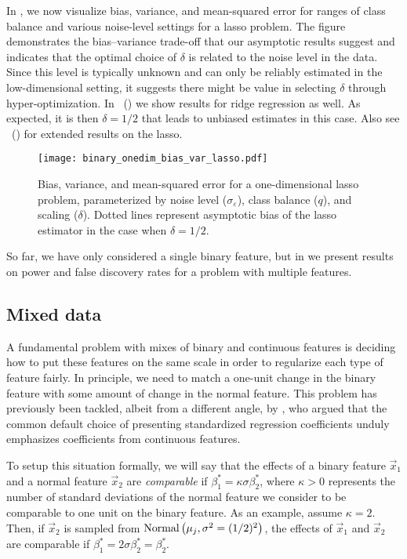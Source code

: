 In , we now visualize bias, variance, and mean-squared
error for ranges of class balance and various noise-level settings for a lasso problem. The
figure demonstrates the bias--variance trade-off that our asymptotic results suggest and
indicates that the optimal choice of \(\delta\) is related to the noise level in the data.
Since this level is typically unknown and can only be reliably estimated in the
low-dimensional setting, it suggests there might be value in selecting \(\delta\) through
hyper-optimization. In
~() we show
results for ridge regression as well. As expected, it is then \(\delta = 1/2\) that leads
to unbiased estimates in this case. Also see
~() for extended
results on the lasso.

\begin{figure}[htb]
  \centering
  \texttt{[image: binary\_onedim\_bias\_var\_lasso.pdf]}
  \caption{%
    Bias, variance, and mean-squared error for a one-dimensional lasso problem,
    parameterized by noise level (\(\sigma_\varepsilon\)), class balance (\(q\)), and
    scaling (\(\delta\)). Dotted lines represent asymptotic bias of the lasso
    estimator in the case when \(\delta = 1/2\).}
  \label{fig:bias-var-onedim-lasso}
\end{figure}

So far, we have only considered a single binary feature, but in
 we present results on power and false discovery rates for a
problem with multiple features.

\subsection{Mixed data}%
\label{sec:mixed-data}

A fundamental problem with mixes of binary and continuous features is deciding how to put
these features on the same scale in order to regularize each type of feature fairly. In
principle, we need to match a one-unit change in the binary feature with some amount of
change in the normal feature. This problem has previously been tackled, albeit from a
different angle, by \citet{gelman2008}, who argued that the common default choice of
presenting standardized regression coefficients unduly emphasizes coefficients from
continuous features.

To setup this situation formally, we will say that the effects of a binary feature
\(\vec{x}_1\) and a normal feature \(\vec{x}_2\) are \emph{comparable} if \(\beta^*_1 =
\kappa \sigma \beta^*_2\), where \(\kappa > 0\) represents the number of standard
deviations of the normal feature we consider to be comparable to one unit on the binary
feature. As an example, assume \(\kappa = 2\). Then, if \(\vec{x}_2\) is sampled from
\(\operatorname{Normal}\left(\mu_j, \sigma^2 = (1/2)^2\right)\), the effects of \(\vec{x}_1\) and
\(\vec{x}_2\) are comparable if \(\beta_1^* = 2\sigma \beta_2^* = \beta_2^*\).

